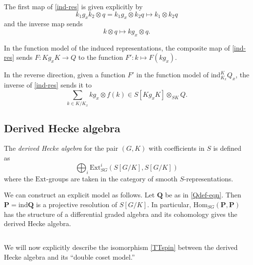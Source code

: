 \documentclass[10pt]{amsart}
\newcommand{\Ext}{\mathrm{Ext}}
\newcommand{\Ad}{\mathrm{Ad}}
\newcommand{\Hom}{\mathrm{Hom}}
\newcommand{\ind}{\mathrm{ind}}
\theoremstyle{remark}
\begin{document}
 
The first map of \eqref{ind-res} is given  explicitly by 
\begin{equation} \label{IR1} k_1 g_x k_2 \otimes q  = k_1 g_x \otimes k_2  q \mapsto k_1 \otimes k_2  q\end{equation} 
and
the inverse map sends \begin{equation} \label{inverse-map} k \otimes q \mapsto k g_x \otimes q.\end{equation}  

%
%
%
%
%
%

%
%
%
%
%



In the function model of the induced representations, the composite map of \eqref{ind-res} 
sends  $F: K g_x K \rightarrow Q$ to the function $F': k \mapsto F(k g_x)$.   
In the reverse direction, given a function $F'$ in the function model of $\ind_{K_x}^K Q_x $,
the inverse of \eqref{ind-res} sends it to 
\begin{equation} \label{yuk-yuk}  \sum_{k \in K/K_x}  k g_x \otimes f(k)  \in S[K g_x K ] \otimes_{SK} Q.\end{equation} 





\subsection{Derived Hecke algebra}  \label{Dha-def}
The {\em derived Hecke algebra} for the pair $(G,K)$ with coefficients in $S$  is defined as 
$$ \bigoplus_i \Ext^i_{SG}(S[G/K], S[G/K])$$
where the $\Ext$-groups are taken in the category of smooth $S$-representations. 

We can construct an explicit model as follows. Let $\mathbf{Q}$ be as in \eqref{Qdef-eqn}. Then 
  $\mathbf{P} = \ind \mathbf{Q} $ is a  projective resolution of $S[G/K]$. 
In particular,  $\Hom_{SG}(\mathbf{P}, \mathbf{P})$
has the structure of a differential graded algebra and its cohomology gives the derived Hecke algebra.



\subsection{} 
We will now explicitly describe the isomorphism \eqref{TTspin} between the derived Hecke algebra  and  its ``double coset model.''  
\end{document}

